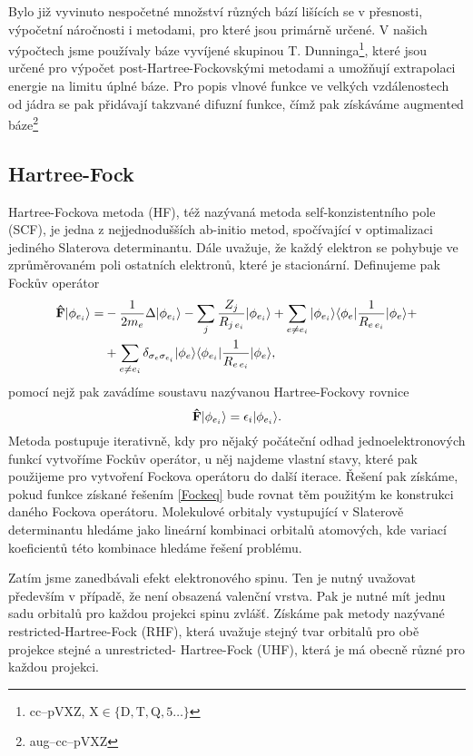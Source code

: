 Bylo již vyvinuto nespočetné množství různých bází lišících se v přesnosti, výpočetní 
náročnosti i metodami, pro které jsou primárně určené.
V našich výpočtech jsme používaly báze vyvíjené 
skupinou T. Dunninga\footnote{cc--pVXZ,  $\mathrm{ X \in \{D,T,Q,5\dots\}}$}\cite{Dunning-basis}, 
které jsou určené pro výpočet post-Hartree-Fockovskými metodami a umožňují extrapolaci 
energie na limitu úplné báze.
Pro popis vlnové funkce ve velkých vzdálenostech od jádra se pak přidávají takzvané 
difuzní funkce, čímž pak získáváme augmented báze\footnote{aug--cc--pVXZ}

\subsection{Hartree-Fock}
Hartree-Fockova metoda (HF), též nazývaná metoda self-konzistentního pole (SCF), je jedna z 
nejjednodušších ab-initio metod, spočívající v optimalizaci jediného Slaterova 
determinantu. Dále uvažuje, že každý elektron se pohybuje ve zprůměrovaném poli 
ostatních elektronů, které je stacionární.
Definujeme pak Fockův operátor
\begin{equation}
\begin{split}
\mathbf{\hat{F}}| \phi_{e_i} \rangle =& -\frac{1}{2m_e}\Delta| \phi_{e_i} \rangle
-\sum_{j} \frac{Z_{j}}{R_{j\,e_i}}| \phi_{e_i} \rangle
+ \sum_{e \neq e_i} | \phi_{e_i} \rangle\langle \phi_{e} | \frac{1}{R_{e\,e_i}} | \phi_{e} \rangle
+\\
&+ \sum_{e \neq e_i} \delta_{\sigma_e \sigma_{e_i}}| \phi_{e} \rangle\langle \phi_{e_i} | \frac{1}{R_{e\,e_i}} | \phi_{e} \rangle,
\end{split}
\end{equation} 
pomocí nejž pak zavádíme soustavu nazývanou Hartree-Fockovy rovnice
\begin{equation}
\mathbf{\hat{F}}| \phi_{e_i} \rangle = \epsilon_i | \phi_{e_i} \rangle.\label{Fockeq}
\end{equation}
Metoda postupuje iterativně, kdy pro nějaký počáteční odhad jednoelektronových funkcí vytvoříme Fockův operátor, u něj najdeme vlastní stavy, které pak použijeme pro vytvoření Fockova operátoru do další iterace.
Řešení pak získáme, pokud funkce získané řešením \eqref{Fockeq} bude rovnat těm použitým ke konstrukci daného Fockova operátoru.
Molekulové orbitaly vystupující v Slaterově determinantu hledáme jako lineární
kombinaci orbitalů 
atomových, kde variací koeficientů této kombinace hledáme řešení problému.

Zatím jsme zanedbávali efekt elektronového spinu. Ten je nutný uvažovat především v 
případě, že není obsazená valenční vrstva. Pak je nutné mít jednu sadu orbitalů pro 
každou projekci spinu zvlášť. Získáme pak metody nazývané restricted-Hartree-Fock 
(RHF), která uvažuje stejný tvar orbitalů pro obě projekce stejné a unrestricted-
Hartree-Fock (UHF), která je má obecně různé pro každou projekci.

